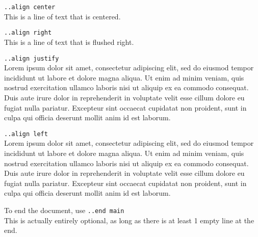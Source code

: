 \documentclass[12pt]{article}
\newcommand{\nl}{\\}
\begin{document}
\begin{center}
\verb|..align center|\nl
This is a line of text that is centered.

\end{center}

\begin{flushright}
\verb|..align right|\nl
This is a line of text that is flushed right.

\end{flushright}
\verb|..align justify|\nl
Lorem ipsum dolor sit amet, consectetur adipiscing elit, sed do eiusmod tempor incididunt ut labore et dolore magna aliqua. Ut enim ad minim veniam, quis nostrud exercitation ullamco laboris nisi ut aliquip ex ea commodo consequat. Duis aute irure dolor in reprehenderit in voluptate velit esse cillum dolore eu fugiat nulla pariatur. Excepteur sint occaecat cupidatat non proident, sunt in culpa qui officia deserunt mollit anim id est laborum.

\medskip


\begin{flushleft}
\verb|..align left|\nl
Lorem ipsum dolor sit amet, consectetur adipiscing elit, sed do eiusmod tempor incididunt ut labore et dolore magna aliqua. Ut enim ad minim veniam, quis nostrud exercitation ullamco laboris nisi ut aliquip ex ea commodo consequat. Duis aute irure dolor in reprehenderit in voluptate velit esse cillum dolore eu fugiat nulla pariatur. Excepteur sint occaecat cupidatat non proident, sunt in culpa qui officia deserunt mollit anim id est laborum.

\bigskip
\bigskip
\bigskip

To end the document, use \verb|..end main|\nl
This is actually entirely optional, as long as there is at least 1 empty line at the end.

\end{flushleft}
\end{document}
